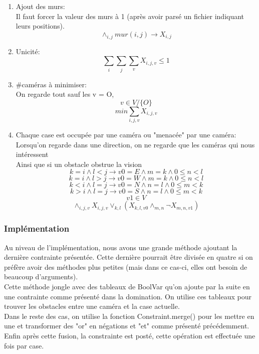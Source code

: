 \begin{enumerate}
    \item Ajout des murs:\\
    Il faut forcer la valeur des murs à 1 (après avoir parsé un fichier indiquant leurs positions).
    \[ \land_{i,j} mur (i,j) \longrightarrow  X_{i,j}\]
    
    \item Unicité:
    \[ \sum_{i} \sum_{j} \sum_{v} X_{i,j,v}  \leq 1 \]
    
    \item \#caméras à minimiser:\\
    On regarde tout sauf les v = O,
    \[  v \in V/\{O\}\]
    \[  min \sum_{i,j,v} X_{i,j,v} \]
    
    \item Chaque case est occupée par une caméra ou "menacée" par une caméra:\\
    Lorsqu'on regarde dans une direction, on ne regarde que les caméras qui nous intéressent\\
    Ainsi que si un obstacle obstrue la vision
    \[ k = i \land l < j \longrightarrow v0 = E \land m=k \land 0 \leq n < l\]
    \[ k = i \land l > j \longrightarrow v0 = W \land m=k \land 0 \leq n < l\]
    \[ k < i \land l = j \longrightarrow v0 = N \land n=l \land 0 \leq m < k\]
    \[ k > i \land l = j \longrightarrow v0 = S \land n=l \land 0 \leq m < k\]
    \[ v1 \in V \]
    \[  \land_{i,j,v} X_{i,j,v} \lor_{k,l} ( X_{k,l,v0} \land_{m,n} \neg X_{m,n,v1} )\]
\end{enumerate}

\subsubsection{Implémentation}
Au niveau de l'implémentation, nous avons une grande méthode ajoutant la dernière contrainte présentée. Cette dernière pourrait être divisée en quatre si on préfère avoir des méthodes plus petites (mais dans ce cas-ci, elles ont besoin de beaucoup d'arguments).\\
Cette méthode jongle avec des tableaux de BoolVar qu'on ajoute par la suite en une contrainte comme présenté dans la domination. On utilise ces tableaux pour trouver les obstacles entre une caméra et la case actuelle.\\
Dans le reste des cas, on utilise la fonction Constraint.merge() pour les mettre en une et transformer des "or" en négations et "et" comme présenté précédemment. Enfin après cette fusion, la constrainte est posté, cette opération est effectuée une fois par case.